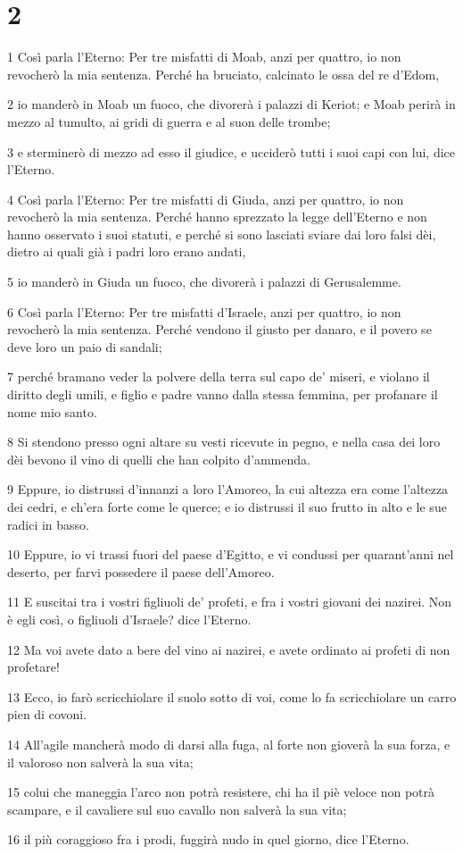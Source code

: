 \chapter{2}

\par 1 Così parla l'Eterno: Per tre misfatti di Moab, anzi per quattro, io non revocherò la mia sentenza. Perché ha bruciato, calcinato le ossa del re d'Edom,
\par 2 io manderò in Moab un fuoco, che divorerà i palazzi di Keriot; e Moab perirà in mezzo al tumulto, ai gridi di guerra e al suon delle trombe;
\par 3 e sterminerò di mezzo ad esso il giudice, e ucciderò tutti i suoi capi con lui, dice l'Eterno.
\par 4 Così parla l'Eterno: Per tre misfatti di Giuda, anzi per quattro, io non revocherò la mia sentenza. Perché hanno sprezzato la legge dell'Eterno e non hanno osservato i suoi statuti, e perché si sono lasciati sviare dai loro falsi dèi, dietro ai quali già i padri loro erano andati,
\par 5 io manderò in Giuda un fuoco, che divorerà i palazzi di Gerusalemme.
\par 6 Così parla l'Eterno: Per tre misfatti d'Israele, anzi per quattro, io non revocherò la mia sentenza. Perché vendono il giusto per danaro, e il povero se deve loro un paio di sandali;
\par 7 perché bramano veder la polvere della terra sul capo de' miseri, e violano il diritto degli umili, e figlio e padre vanno dalla stessa femmina, per profanare il nome mio santo.
\par 8 Si stendono presso ogni altare su vesti ricevute in pegno, e nella casa dei loro dèi bevono il vino di quelli che han colpito d'ammenda.
\par 9 Eppure, io distrussi d'innanzi a loro l'Amoreo, la cui altezza era come l'altezza dei cedri, e ch'era forte come le querce; e io distrussi il suo frutto in alto e le sue radici in basso.
\par 10 Eppure, io vi trassi fuori del paese d'Egitto, e vi condussi per quarant'anni nel deserto, per farvi possedere il paese dell'Amoreo.
\par 11 E suscitai tra i vostri figliuoli de' profeti, e fra i vostri giovani dei nazirei. Non è egli così, o figliuoli d'Israele? dice l'Eterno.
\par 12 Ma voi avete dato a bere del vino ai nazirei, e avete ordinato ai profeti di non profetare!
\par 13 Ecco, io farò scricchiolare il suolo sotto di voi, come lo fa scricchiolare un carro pien di covoni.
\par 14 All'agile mancherà modo di darsi alla fuga, al forte non gioverà la sua forza, e il valoroso non salverà la sua vita;
\par 15 colui che maneggia l'arco non potrà resistere, chi ha il piè veloce non potrà scampare, e il cavaliere sul suo cavallo non salverà la sua vita;
\par 16 il più coraggioso fra i prodi, fuggirà nudo in quel giorno, dice l'Eterno.

